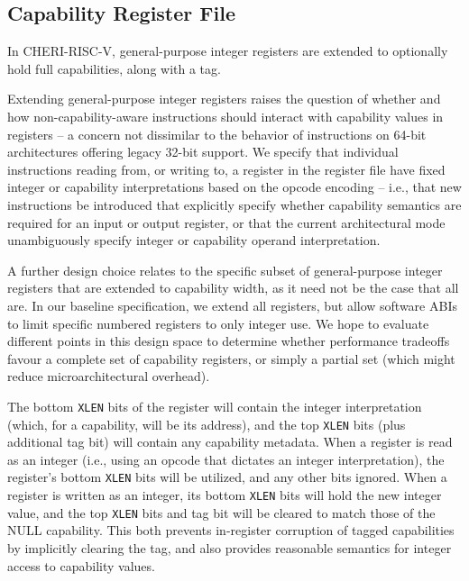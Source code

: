\subsection{Capability Register File}

In CHERI-RISC-V,
general-purpose integer registers are extended to optionally hold
full
capabilities, along with a tag.

Extending general-purpose integer registers raises the
question of whether and how non-capability-aware instructions should
interact with capability values in registers -- a concern not dissimilar to
the behavior of instructions on 64-bit architectures offering legacy 32-bit
support.
We specify that individual instructions reading from, or writing to, a
register in the register file have fixed integer or capability interpretations
based on the opcode encoding -- i.e., that new instructions be introduced that
explicitly specify whether capability semantics are required for an input or
output register, or that the current architectural mode unambiguously specify
integer or capability operand interpretation.

A further design choice relates to the specific subset of general-purpose
integer registers that are extended to capability width, as it need not be the
case that all are.
In our baseline specification, we extend all registers, but allow software
ABIs to limit specific numbered registers to only integer use.
We hope to evaluate different points in this design space to determine whether
performance tradeoffs favour a complete set of capability registers, or simply
a partial set (which might reduce microarchitectural overhead).

The bottom \texttt{XLEN} bits of the register will contain the integer
interpretation (which, for a capability, will be its address), and the
top \texttt{XLEN} bits (plus additional tag bit) will contain any capability
metadata.
When a register is read as an integer (i.e., using an opcode that dictates an
integer interpretation),
the register's bottom \texttt{XLEN} bits will be utilized, and any other bits ignored.
When a register is written as an integer, its bottom \texttt{XLEN} bits will
hold the new
integer value, and the top \texttt{XLEN} bits and tag bit will be cleared to match
those of the NULL capability. This both prevents in-register corruption of tagged
capabilities by implicitly clearing the tag, and also provides reasonable semantics
for integer access to capability values.

